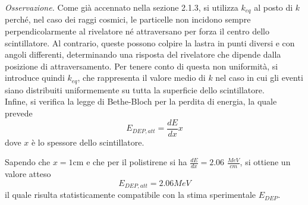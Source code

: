 \textit{Osservazione.} Come già accennato nella sezione 2.1.3, si utilizza $k_{eq}$ al posto di $k$ perché, nel caso dei raggi cosmici, le 
particelle non incidono sempre perpendicolarmente al rivelatore né attraversano per forza
il centro dello scintillatore. Al contrario, queste possono colpire la lastra in 
punti diversi e con angoli differenti, determinando una risposta del rivelatore 
che dipende dalla posizione di attraversamento.
Per tenere conto di questa non uniformità, si introduce quindi $k_{eq}$, che rappresenta il valore medio di $k$ nel caso in cui gli eventi siano distribuiti uniformemente su tutta la superficie dello scintillatore. \\

Infine, si verifica la legge di Bethe-Bloch per la perdita di energia, la quale prevede $$E_{DEP,att} = \frac{dE}{dx}x$$
dove $x$ è lo spessore dello scintillatore. 

Sapendo che $x=1\text{cm}$ e che per il polistirene si ha $\frac{dE}{dx}=2.06$ $\frac{MeV}{cm}$, si ottiene un valore atteso
$$E_{DEP,att} = 2.06 MeV $$ il quale risulta statisticamente compatibile con la stima sperimentale $E_{DEP}$.
